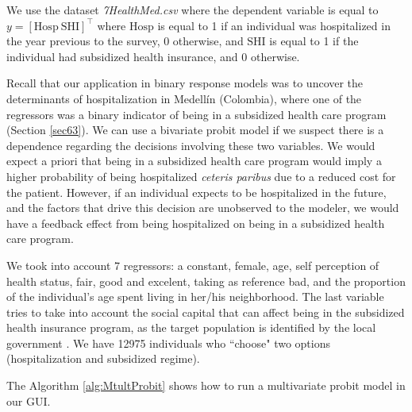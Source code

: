 We use the dataset \textit{7HealthMed.csv} where the dependent variable is equal to $y = \left[\text{Hosp} \ \text{SHI}\right]^{\top}$ where $\text{Hosp}$ is equal to 1 if an individual was hospitalized in the year previous to the survey, 0 otherwise, and $\text{SHI}$ is equal to 1 if the individual had subsidized health insurance, and 0 otherwise. 

Recall that our application in binary response models was to uncover the determinants of hospitalization in Medell\'in (Colombia), where one of the regressors was a binary indicator of being in a subsidized health care program (Section \ref{sec63}). We can use a bivariate probit model if we suspect there is a dependence regarding the decisions involving these two variables. We would expect a priori that being in a subsidized health care program would imply a higher probability of being hospitalized \textit{ceteris paribus} due to a reduced cost for the patient. However, if an individual expects to be hospitalized in the future, and the factors that drive this decision are unobserved to the modeler, we would have a feedback effect from being hospitalized on being in a subsidized health care program.

We took into account 7 regressors: a constant, female, age, self perception of health status, fair, good and excelent, taking as reference bad, and the proportion of the individual's age spent living in her/his neighborhood. The last variable tries to take into account the social capital that can affect being in the subsidized health insurance program, as the target population is identified by the local government \cite{Ramirez2019a}. We have 12975 individuals who ``choose" two options (hospitalization and subsidized regime).

The Algorithm \ref{alg:MtultProbit} shows how to run a multivariate probit model in our GUI. 

